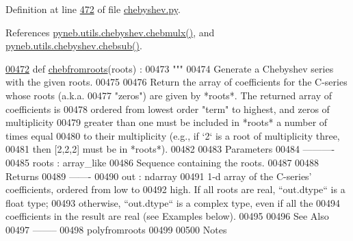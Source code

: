 Definition at line \hyperlink{chebyshev_8py_source_l00472}{472} of file \hyperlink{chebyshev_8py_source}{chebyshev.\+py}.



References \hyperlink{chebyshev_8py_source_l00637}{pyneb.\+utils.\+chebyshev.\+chebmulx()}, and \hyperlink{chebyshev_8py_source_l00584}{pyneb.\+utils.\+chebyshev.\+chebsub()}.


\begin{DoxyCode}
\hypertarget{namespacepyneb_1_1utils_1_1chebyshev_l00472}{}\hyperlink{namespacepyneb_1_1utils_1_1chebyshev_abedf5cf14ea9229321fc5e4043c42a0d}{00472} \textcolor{keyword}{def }\hyperlink{namespacepyneb_1_1utils_1_1chebyshev_abedf5cf14ea9229321fc5e4043c42a0d}{chebfromroots}(roots) :
00473     \textcolor{stringliteral}{"""}
00474 \textcolor{stringliteral}{    Generate a Chebyshev series with the given roots.}
00475 \textcolor{stringliteral}{}
00476 \textcolor{stringliteral}{    Return the array of coefficients for the C-series whose roots (a.k.a.}
00477 \textcolor{stringliteral}{    "zeros") are given by *roots*.  The returned array of coefficients is}
00478 \textcolor{stringliteral}{    ordered from lowest order "term" to highest, and zeros of multiplicity}
00479 \textcolor{stringliteral}{    greater than one must be included in *roots* a number of times equal}
00480 \textcolor{stringliteral}{    to their multiplicity (e.g., if `2` is a root of multiplicity three,}
00481 \textcolor{stringliteral}{    then [2,2,2] must be in *roots*).}
00482 \textcolor{stringliteral}{}
00483 \textcolor{stringliteral}{    Parameters}
00484 \textcolor{stringliteral}{    ----------}
00485 \textcolor{stringliteral}{    roots : array\_like}
00486 \textcolor{stringliteral}{        Sequence containing the roots.}
00487 \textcolor{stringliteral}{}
00488 \textcolor{stringliteral}{    Returns}
00489 \textcolor{stringliteral}{    -------}
00490 \textcolor{stringliteral}{    out : ndarray}
00491 \textcolor{stringliteral}{        1-d array of the C-series' coefficients, ordered from low to}
00492 \textcolor{stringliteral}{        high.  If all roots are real, ``out.dtype`` is a float type;}
00493 \textcolor{stringliteral}{        otherwise, ``out.dtype`` is a complex type, even if all the}
00494 \textcolor{stringliteral}{        coefficients in the result are real (see Examples below).}
00495 \textcolor{stringliteral}{}
00496 \textcolor{stringliteral}{    See Also}
00497 \textcolor{stringliteral}{    --------}
00498 \textcolor{stringliteral}{    polyfromroots}
00499 \textcolor{stringliteral}{}
00500 \textcolor{stringliteral}{    Notes}

\end{DoxyCode}

